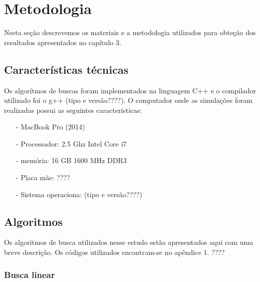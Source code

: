 \chapter{Metodologia}

Nesta seção descrevemos os materiais e a metodologia utilizados para obteção dos resultados apresentados no capítulo 3.

\section{Características técnicas}

Os algorítmos de buscas foram implementados na linguagem C++ e o compilador utilizado foi o g++ (tipo e versão????). O computador onde as simulações foram realizadas possui as seguintes características:
\begin{itemize}
\item[-] MacBook Pro (2014)
\item[-] Processador: 2.5 Ghz Intel Core i7
\item[-] memória: 16 GB 1600 MHz DDR3
\item[-] Placa mãe: ????
\item[-] Sistema operaciona: (tipo e versão????)
\end{itemize}

\section{Algoritmos}

Os algoritmos de busca utilizados nesse estudo estão apresentados aqui com uma breve descrição. Os códigos utilizados encontram-se no apêndice 1. ????



\subsection{Busca linear}


